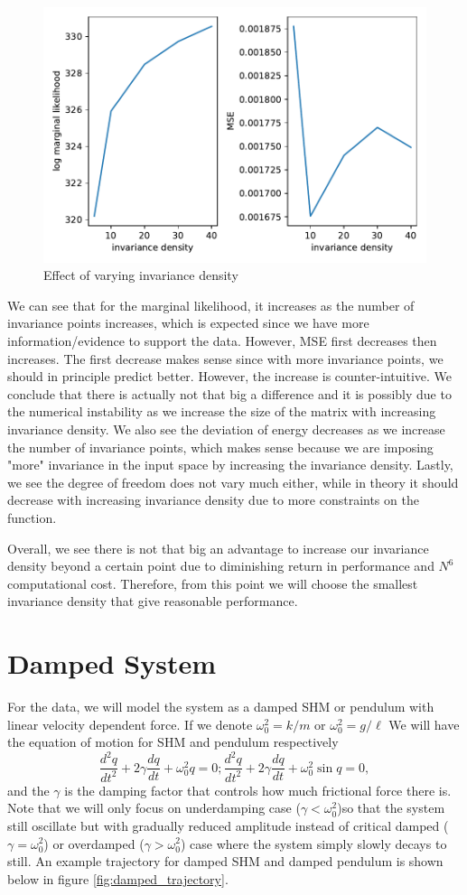 \documentclass{statsmsc}
\begin{document}
\begin{figure}[H] 
  \includegraphics[width=0.8\linewidth]{../codes/figures/vary_invariance.pdf}
  \centering
  \caption{Effect of varying invariance density}
  \label{fig:vary_invariance_density}
\end{figure}

We can see that for the marginal likelihood, it increases as the number of invariance points increases, which is expected since we have more information/evidence to support the data.
However, MSE first decreases then increases.
The first decrease makes sense since with more invariance points, we should in principle predict better.
However, the increase is counter-intuitive.
We conclude that there is actually not that big a difference and it is possibly due to the numerical instability as we increase the size of the matrix with increasing invariance density.  
We also see the deviation of energy decreases as we increase the number of invariance points, which makes sense because we are imposing "more" invariance in the input space by increasing the invariance density.
Lastly, we see the degree of freedom does not vary much either, while in theory it should decrease with increasing invariance density due to more constraints on the function.

Overall, we see there is not that big an advantage to increase our invariance density beyond a certain point due to diminishing return in performance and $N^6$ computational cost.
Therefore, from this point we will choose the smallest invariance density that give reasonable performance.  


\section{Damped System}
For the data, we will model the system as a damped SHM or pendulum with linear velocity dependent force.
If we denote $\omega_0^2=k/m$ or $\omega_0^2=g/\ell$
We will have the equation of motion for SHM and pendulum respectively
$$
\frac{d^2q}{dt^2}+2\gamma\frac{dq}{dt}+\omega_0^2q=0; \frac{d^2q}{dt^2}+2\gamma\frac{dq}{dt}+\omega_0^2\sin q=0 ,
$$
and the $\gamma$ is the damping factor that controls how much frictional force there is. 
Note that we will only focus on underdamping case ($\gamma < \omega_0^2$)so that the system still oscillate but with gradually reduced amplitude instead of critical damped ($\gamma=\omega_0^2$) or overdamped ($\gamma>\omega_0^2$) case where the system simply slowly decays to still.
An example trajectory for damped SHM and damped pendulum is shown below in figure \ref{fig:damped_trajectory}.
\end{document}

